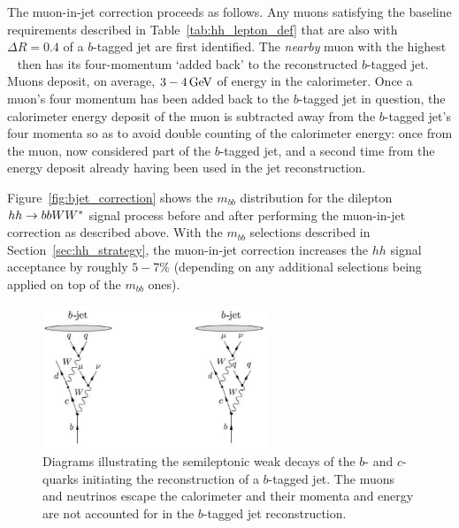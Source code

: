 The muon-in-jet correction proceeds as follows.
Any muons satisfying the baseline requirements described in Table~\ref{tab:hh_lepton_def} that
are also with $\Delta R = 0.4$ of a $b$-tagged jet are first identified.
The \textit{nearby} muon with the highest \pT~ then has its four-momentum `added back' to the reconstructed
$b$-tagged jet.
Muons deposit, on average, $3-4\,\text{Ge\kern -0.1em V}$ of energy in the calorimeter.
Once a muon's four momentum has been added back to the $b$-tagged jet in question, the calorimeter
energy deposit of the muon is subtracted away from the $b$-tagged jet's four momenta so as to avoid double
counting of the calorimeter energy: once from the muon, now considered part of the $b$-tagged jet, and a
second time from the energy deposit already having been used in the jet reconstruction.

Figure~\ref{fig:bjet_correction} shows the $m_{bb}$ distribution for the dilepton
$hh \rightarrow bbWW^*$ signal process before and after performing the muon-in-jet correction
as described above.
With the $m_{bb}$ selections described in Section~\ref{sec:hh_strategy}, the muon-in-jet
correction increases the $hh$ signal acceptance by roughly $5-7\%$ (depending on any additional
selections being applied on top of the $m_{bb}$ ones).

\begin{figure}[!htb]
    \begin{center}
        \includegraphics[width=0.6\textwidth]{figures/search_hh/bjet_semileptonic}
        \caption{
            Diagrams illustrating the semileptonic weak decays of the $b$- and $c$-quarks initiating the reconstruction
                of a $b$-tagged jet.
                The muons and neutrinos escape the calorimeter and their momenta and energy are not accounted
                for in the $b$-tagged jet reconstruction.
        }
        \label{fig:bjet_semileptonic}
    \end{center}
\end{figure}

